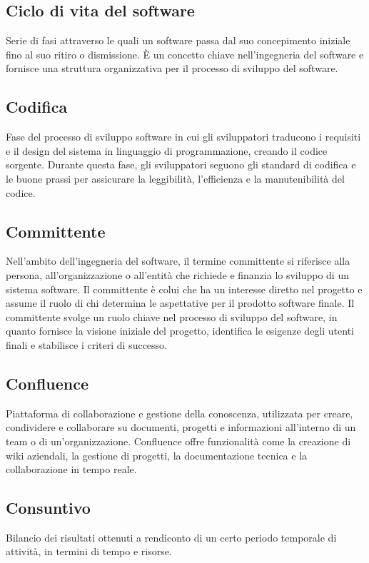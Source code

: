 \hypertarget{sec:ciclo_di_vita}{}
\subsection*{Ciclo di vita del software}
Serie di fasi attraverso le quali un software passa dal suo concepimento iniziale fino al suo ritiro o dismissione. È un concetto chiave nell'ingegneria 
del software e fornisce una struttura organizzativa per il processo di sviluppo del software.

\hypertarget{sec:codifica}{}
\subsection*{Codifica}
Fase del processo di sviluppo software in cui gli sviluppatori traducono i requisiti e il design del sistema in linguaggio di programmazione, creando il 
codice sorgente. Durante questa fase, gli sviluppatori seguono gli standard di codifica e le buone prassi per assicurare la leggibilità, l’efficienza e la 
manutenibilità del codice.

\hypertarget{sec:committente}{}
\subsection*{Committente}
Nell’ambito dell’ingegneria del software, il termine committente si riferisce alla persona, all’organizzazione o all’entità che richiede e 
finanzia lo sviluppo di un sistema software. Il committente è colui che ha un interesse diretto nel progetto e assume il ruolo
di chi determina le aspettative per il prodotto software finale. Il committente svolge un ruolo chiave nel processo di sviluppo del software, 
in quanto fornisce la visione iniziale del progetto, identifica le esigenze degli utenti finali e stabilisce i criteri di successo.

\hypertarget{sec:confluence}{}
\subsection*{Confluence}
Piattaforma di collaborazione e gestione della conoscenza, utilizzata per creare, condividere e collaborare su documenti, progetti e informazioni all'interno 
di un team o di un'organizzazione. Confluence offre funzionalità come la creazione di wiki aziendali, la gestione di progetti, la documentazione tecnica e la 
collaborazione in tempo reale.

\hypertarget{sec:consuntivo}{}
\subsection*{Consuntivo}
Bilancio dei risultati ottenuti a rendiconto di un certo periodo temporale di attività, in termini di tempo e risorse.

